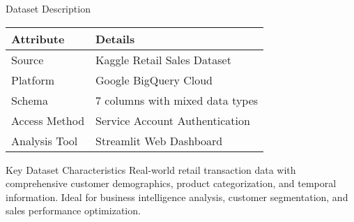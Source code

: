 \documentclass[aspectratio=169]{beamer}
\begin{document}
\begin{frame}{Dataset Description}
\begin{table}[h]
\centering
\begin{tabular}{@{}ll@{}}
\toprule
\textbf{Attribute} & \textbf{Details} \\
\midrule
Source & Kaggle Retail Sales Dataset \\
Platform & Google BigQuery Cloud \\
Schema & 7 columns with mixed data types \\
Access Method & Service Account Authentication \\
Analysis Tool & Streamlit Web Dashboard \\
\bottomrule
\end{tabular}
\end{table}

\vspace{0.5cm}

\begin{alertblock}{Key Dataset Characteristics}
Real-world retail transaction data with comprehensive customer demographics, product categorization, and temporal information. Ideal for business intelligence analysis, customer segmentation, and sales performance optimization.
\end{alertblock}
\end{frame}
\end{document}
